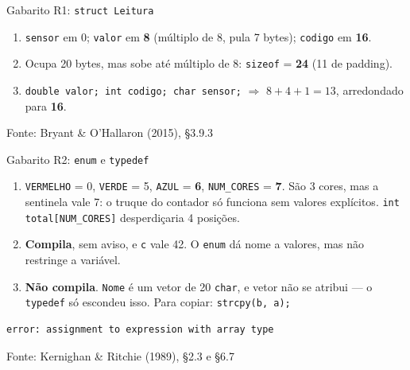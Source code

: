 \documentclass[aspectratio=169]{beamer}
\newcommand{\fonte}[1]{\vfill\hfill{\scriptsize\textcolor{UFSGray}{Fonte: #1}}}
\begin{document}
\begin{frame}{Gabarito R1: \texttt{struct Leitura}}
  \begin{center}
  \end{center}
  \small
  \begin{enumerate}
    \item[(a)] \texttt{sensor} em 0; \texttt{valor} em \textbf{8} (múltiplo
      de 8, pula 7 bytes); \texttt{codigo} em \textbf{16}.
    \item[(b)] Ocupa 20 bytes, mas sobe até múltiplo de 8:
      \texttt{sizeof} = \textbf{24} (11 de padding).
    \item[(c)] \texttt{double valor; int codigo; char sensor;} $\Rightarrow$
      $8 + 4 + 1 = 13$, arredondado para \textbf{16}.
  \end{enumerate}
  \fonte{Bryant \& O'Hallaron (2015), §3.9.3~\cite{bryant2015computer}}
\end{frame}

\begin{frame}[fragile]{Gabarito R2: \texttt{enum} e \texttt{typedef}}
  \small
  \begin{enumerate}
    \item[(a)] \texttt{VERMELHO} = 0, \texttt{VERDE} = 5, \texttt{AZUL} =
      \textbf{6}, \texttt{NUM\_CORES} = \textbf{7}. São 3 cores, mas a
      sentinela vale 7: o truque do contador só funciona sem valores
      explícitos. \texttt{int total[NUM\_CORES]} desperdiçaria 4 posições.
    \item[(b)] \textbf{Compila}, sem aviso, e \texttt{c} vale 42. O
      \texttt{enum} dá nome a valores, mas não restringe a variável.
    \item[(c)] \textbf{Não compila}. \texttt{Nome} é um vetor de 20
      \texttt{char}, e vetor não se atribui --- o \texttt{typedef} só
      escondeu isso. Para copiar: \texttt{strcpy(b, a);}
  \end{enumerate}
\begin{lstlisting}[style=shellStyle]
error: assignment to expression with array type
\end{lstlisting}
  \fonte{Kernighan \& Ritchie (1989), §2.3 e §6.7~\cite{kernighan1989c}}
\end{frame}
\end{document}
